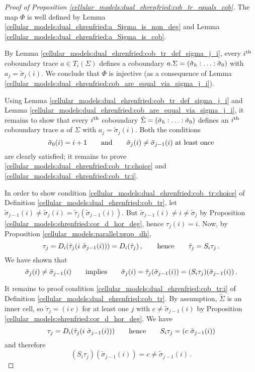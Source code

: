 \begin{proof}[Proof of Proposition \ref{cellular_models:dual_ehrenfried:cob_tr_equals_cob}]
    The map $\Phi$ is well defined by Lemma \ref{cellular_models:dual_ehrenfried:a_Sigma_is_non_deg} and Lemma \ref{cellular_models:dual_ehrenfried:a_Sigma_is_cob}.
    
    By Lemma \ref{cellular_models:dual_ehrenfried:cob_tr_def_sigma_j_i},
    every $i\Th$ coboundary trace $a\in T_i(\Sigma)$ defines a coboundary $a.\Sigma = \homog[\tilde\sigma]$ with $a_j = \tilde\sigma_j(i)$.
    We conclude that $\Phi$ is injective (as a consequence of Lemma \ref{cellular_models:dual_ehrenfried:cob_are_equal_via_sigma_j_i}).
    
    Using Lemma \ref{cellular_models:dual_ehrenfried:cob_tr_def_sigma_j_i} and Lemma \ref{cellular_models:dual_ehrenfried:cob_are_equal_via_sigma_j_i},
    it remains to show that every $i\Th$ coboundary $\tilde\Sigma = \homog[\tilde\sigma]$ defines an $i\Th$ coboundary trace $a$ of $\Sigma$ with $a_j = \tilde\sigma_j(i)$.
    Both the conditions
    \[
        \tilde\sigma_0(i) = i+1 \mspc{and}{20} \tilde\sigma_j(i) \neq \tilde\sigma_{j-1}(i) \text{ at least once}
    \]
    are clearly satisfied; it remains to prove \ref{cellular_models:dual_ehrenfried:cob_tr:choice} and \ref{cellular_models:dual_ehrenfried:cob_tr:i}.
    
    In order to show condition \ref{cellular_models:dual_ehrenfried:cob_tr:choice} of Definition \ref{cellular_models:dual_ehrenfried:cob_tr},
    let $\tilde\sigma_{j-1}(i) \neq \tilde\sigma_j(i) = \tilde\tau_j(\tilde\sigma_{j-1}(i))$.
    But $\tilde\sigma_{j-1}(i) \neq i \neq \tilde\sigma_j$ by Proposition \ref{cellular_models:ehrenfried:cor_d_hor_deg}, hence $\tau_j(i) = i$.
    Now, by Proposition \ref{cellular_models:parallel:prop_dh},
    \[
        \tau_j = D_i(\tilde\tau_j (i\ \tilde\sigma_{j-1}(i))) = D_i( \tilde\tau_j)\,, \mspc{hence}{20} \tilde\tau_j = S_i\tau_j \,.
    \]
    We have shown that
    \[
        \tilde\sigma_j(i) \neq \tilde\sigma_{j-1}(i) \mspc{implies}{20} \tilde\sigma_j(i) = \tilde\tau_j(\tilde\sigma_{j-1}(i)) = (S_i\tau_j)(\tilde\sigma_{j-1}(i)) \,.
    \]
    
    It remains to proof condition \ref{cellular_models:dual_ehrenfried:cob_tr:i} of Definition \ref{cellular_models:dual_ehrenfried:cob_tr}.
    By assumption, $\tilde\Sigma$ is an inner cell, so $\tilde\tau_j = (i\ c)$ for at least one $j$ with $c \neq \tilde\sigma_{j-1}(i)$ by Proposition \ref{cellular_models:ehrenfried:cor_d_hor_deg}.
    We have
    \[
        \tau_j = D_i(\tilde\tau_j (i\ \tilde\sigma_{j-1}(i))) \mspc{hence}{20} S_i\tau_j = (c\ \tilde\sigma_{j-1}(i)) 
    \]
    and therefore
    \[
        (S_i\tau_j)(\tilde\sigma_{j-1}(i)) = c \neq \tilde\sigma_{j-1}(i) \,.
    \]
\end{proof}

